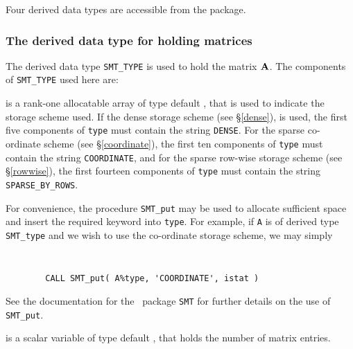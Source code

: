\documentclass{galahad}
\begin{document}


\galtypes
Four derived data types are accessible from the package.


\subsubsection{The derived data type for holding matrices}\label{typesmt}
The derived data type {\tt SMT\_TYPE} is used to hold the matrix ${\mathbf{A}}$.
The components of {\tt SMT\_TYPE} used here are:

\begin{description}

 
 
 is a rank-one allocatable array of type default \character, that
is used to indicate the storage scheme used. If the dense storage scheme 
(see \S\ref{dense}), is used, 
the first five components of {\tt type} must contain the
string {\tt DENSE}.
For the sparse co-ordinate scheme (see \S\ref{coordinate}), 
the first ten components of {\tt type} must contain the
string {\tt COORDINATE},  and
for the sparse row-wise storage scheme (see \S\ref{rowwise}),
the first fourteen components of {\tt type} must contain the
string {\tt SPARSE\_BY\_ROWS}.

For convenience, the procedure {\tt SMT\_put} 
may be used to allocate sufficient space and insert the required keyword
into {\tt type}.
For example, if {\tt A} is of derived type {\tt SMT\_type}
and we wish to use the co-ordinate storage scheme, we may simply
{\tt 
\begin{verbatim}
        CALL SMT_put( A%type, 'COORDINATE', istat )
\end{verbatim}
}
\noindent
See the documentation for the \galahad\ package {\tt SMT} 
for further details on the use of {\tt SMT\_put}.

 is a scalar variable of type default \integer, that
holds the number of matrix entries.


\end{description}
\end{document}
